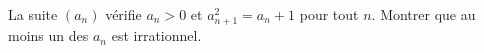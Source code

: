 La suite $(a_n)$ vérifie $a_n > 0$ et $a_{n+1}^2 = a_n + 1$ pour tout $n$. Montrer que au moins un des $a_n$ est irrationnel.
